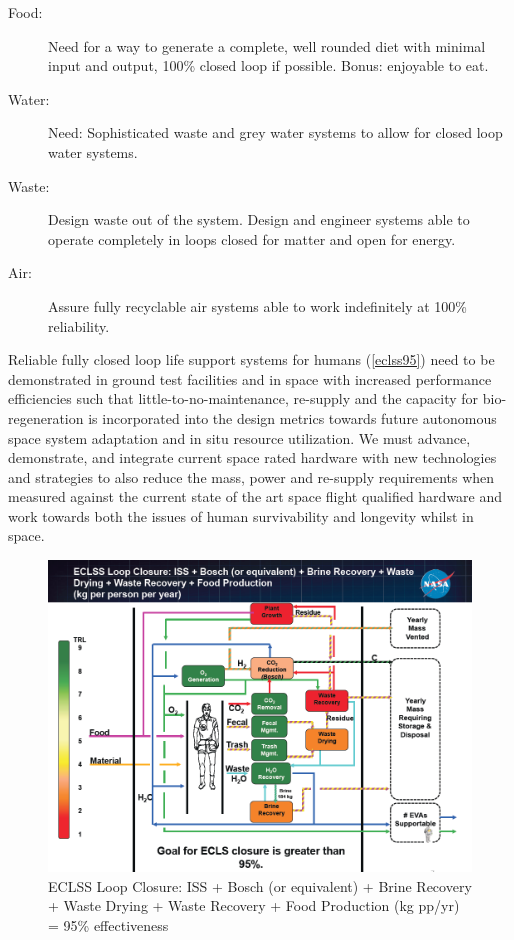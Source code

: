 \documentclass[letter,11pt]{article}
\begin{document}
\begin{description}
\item[Food:] Need for a way to generate a complete, well rounded diet with minimal
input and output, 100\% closed loop if possible.  Bonus: enjoyable to eat.

\item[Water:] Need: Sophisticated waste and grey water systems to allow for closed loop water systems.

\item[Waste:] Design waste out of the system. Design and engineer systems able to operate completely in loops closed for matter and open for energy.

\item[Air:] Assure fully recyclable air systems able to work indefinitely at 100\% reliability.
\end{description}

Reliable fully closed loop life support systems for humans (\autoref{eclss95})
need to be demonstrated in ground test facilities and in space with increased
performance efficiencies such that little-to-no-maintenance, re-supply and the
capacity for bio-regeneration is incorporated into the design metrics towards
future autonomous space system adaptation and in situ resource utilization. We
must advance, demonstrate, and integrate current space rated hardware with new
technologies and strategies to also reduce the mass, power and re-supply
requirements when measured against the current state of the art space flight
qualified hardware and work towards both the issues of human survivability and
longevity whilst in space.
 
\begin{figure}[hb!]
	\centering
	\includegraphics[width=\textwidth]{SJTable2}

	\caption{ECLSS Loop Closure: ISS + Bosch (or equivalent) + Brine Recovery + Waste Drying + Waste Recovery + Food Production (kg pp/yr) = 95\% effectiveness \cite{Neumeyer2010}}
	\label{eclss95}
\end{figure}
\end{document}
